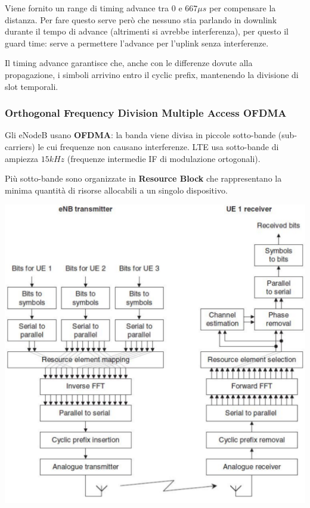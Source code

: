 Viene fornito un range di timing advance tra $0$ e $667\mu s$ per compensare la distanza. Per fare questo serve però che nessuno stia parlando in downlink durante il tempo di advance (altrimenti si avrebbe interferenza), per questo il guard time: serve a permettere l'advance per l'uplink senza interferenze.

Il timing advance garantisce che, anche con le differenze dovute alla propagazione, i simboli arrivino entro il cyclic prefix, mantenendo la divisione di slot temporali.

\subsubsection{Orthogonal Frequency Division Multiple Access OFDMA}

Gli eNodeB usano \textbf{OFDMA}: la banda viene divisa in piccole sotto-bande (sub-carriers) le cui frequenze non causano interferenze. LTE usa sotto-bande di ampiezza $15 kHz$ (frequenze intermedie IF di modulazione ortogonali). 

Più sotto-bande sono organizzate in \textbf{Resource Block} che rappresentano la minima quantità di risorse allocabili a un singolo dispositivo.

\begin{center}
	\includegraphics[width=0.85\linewidth]{img/4g/utranofdma}
\end{center}

